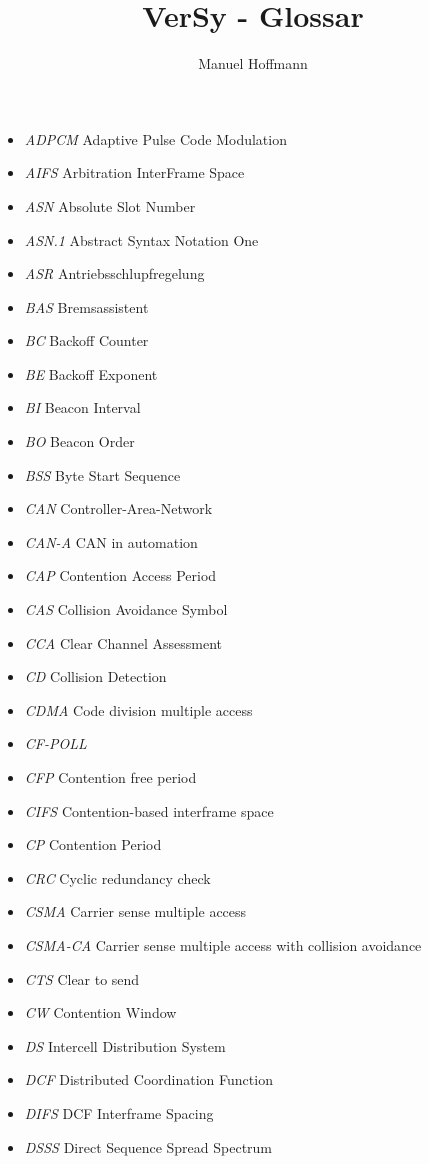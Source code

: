 \documentclass{article}
\title{VerSy - Glossar}
\author{Manuel Hoffmann}
\begin{document}
\begin{itemize}
	\item \emph{ADPCM} Adaptive Pulse Code Modulation
	\item \emph{AIFS} Arbitration InterFrame Space
	\item \emph{ASN} Absolute Slot Number
	\item \emph{ASN.1} Abstract Syntax Notation One
	\item \emph{ASR} Antriebsschlupfregelung
	\item \emph{BAS} Bremsassistent
	\item \emph{BC} Backoff Counter
	\item \emph{BE} Backoff Exponent
	\item \emph{BI} Beacon Interval
	\item \emph{BO} Beacon Order
	\item \emph{BSS} Byte Start Sequence
	\item \emph{CAN} Controller-Area-Network
	\item \emph{CAN-A} CAN in automation
	\item \emph{CAP} Contention Access Period
	\item \emph{CAS} Collision Avoidance Symbol
	\item \emph{CCA} Clear Channel Assessment
	\item \emph{CD} Collision Detection
	\item \emph{CDMA} Code division multiple access
	\item \emph{CF-POLL}
	\item \emph{CFP} Contention free period
	\item \emph{CIFS} Contention-based interframe space
	\item \emph{CP} Contention Period
	\item \emph{CRC} Cyclic redundancy check
	\item \emph{CSMA} Carrier sense multiple access
	\item \emph{CSMA-CA} Carrier sense multiple access with collision avoidance
	\item \emph{CTS} Clear to send
	\item \emph{CW} Contention Window
	\item \emph{DS} Intercell Distribution System
	\item \emph{DCF} Distributed Coordination Function
	\item \emph{DIFS} DCF Interframe Spacing
	\item \emph{DSSS} Direct Sequence Spread Spectrum

\end{itemize}
\end{document}
